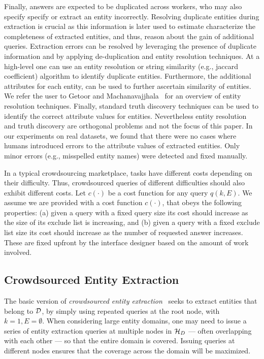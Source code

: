 \iftr
Finally, answers are expected to be duplicated across workers, who may also specify specify or extract an entity incorrectly. Resolving duplicate entities during extraction is crucial as this information is later used to estimate characterize the completeness of extracted entities, and thus, reason about the gain of additional queries.  Extraction errors can be resolved by leveraging the presence of duplicate information and by applying de-duplication and entity resolution techniques. At a high-level one can use an entity resolution or string similarity (e.g., jaccard coefficient) algorithm to identify duplicate entities. Furthermore, the additional attributes for each entity, can be used to further ascertain similarity of entities. We refer the user to Getoor and Machanavajjhala~\cite{getoor:kdd13} for an overview of entity resolution techniques. Finally, standard truth discovery techniques can be used to identify the correct attribute values for entities. Nevertheless entity resolution and truth discovery are orthogonal problems and not the focus of this paper. In our experiments on real datasets, we found that there were no cases where humans introduced errors to the attribute values of extracted entities. Only minor errors (e.g., misspelled entity names) were detected and fixed manually. \fi

 In a typical crowdsourcing marketplace, tasks have different costs depending on their difficulty. Thus, crowdsourced queries of different difficulties should also exhibit different costs. Let $c(\cdot)$ be a cost function for any query $q(k,E)$. We assume we are provided with a cost function $c(\cdot)$, that obeys the following properties:  (a) given a query with a fixed query size its cost should increase as the size of its exclude list is increasing, and (b) given a query with a fixed exclude list size its cost should increase as the number of requested answer increases. These are fixed upfront by the interface designer based on the amount of work involved.

\subsection{Crowdsourced Entity Extraction}
\label{sec:extraction}
The basic version of {\em crowdsourced entity extraction}~\cite{trushkowsky:2013} seeks to extract entities that belong to $\mathcal{D}$, by simply using repeated queries at the root node, with $k = 1, E = \emptyset$. When considering large entity domains, one may need to issue a series of entity extraction queries at multiple nodes in  $\mathcal{H}_D$ --- often overlapping with each other --- so that the entire domain is covered. Issuing queries at different nodes ensures that the coverage across the domain will be maximized. 

